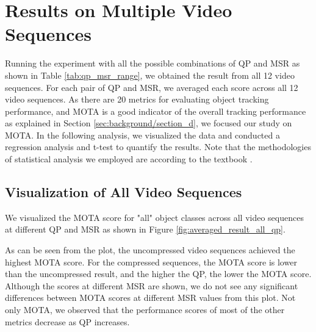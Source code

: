 \section{Results on Multiple Video Sequences}
\label{sec:results/section_a}

Running the experiment with all the possible combinations of QP and MSR as shown in Table \ref{tab:qp_msr_range}, we obtained the result from all 12 video sequences. For each pair of QP and MSR, we averaged each score across all 12 video sequences. As there are 20 metrics for evaluating object tracking performance, and MOTA is a good indicator of the overall tracking performance as explained in Section \ref{sec:background/section_d}, we focused our study on MOTA. In the following analysis, we visualized the data and conducted a regression analysis and t-test to quantify the results. Note that the methodologies of statistical analysis we employed are according to the textbook \cite{kutner_applied_2005}.


\subsection{Visualization of All Video Sequences}
\label{subsec:/results/section_a/visualization}
We visualized the MOTA score for "all" object classes across all video sequences at different QP and MSR as shown in Figure \ref{fig:averaged_result_all_qp}.

As can be seen from the plot, the uncompressed video sequences achieved the highest MOTA score. For the compressed sequences, the MOTA score is lower than the uncompressed result, and the higher the QP, the lower the MOTA score. Although the scores at different MSR are shown, we do not see any significant differences between MOTA scores at different MSR values from this plot. Not only MOTA, we observed that the performance scores of most of the other metrics decrease as QP increases.

